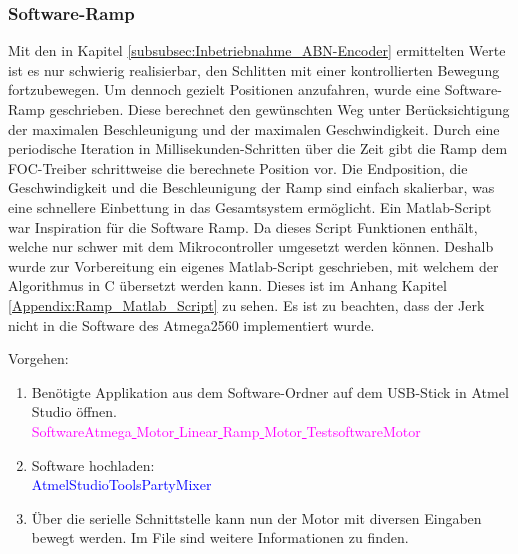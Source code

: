 \subsubsection{Software-Ramp}
\label{subsubsec:Software_Ramp}

Mit den in Kapitel \ref{subsubsec:Inbetriebnahme_ABN-Encoder} ermittelten Werte ist es nur schwierig realisierbar, den Schlitten mit einer kontrollierten Bewegung fortzubewegen. Um dennoch gezielt Positionen anzufahren, wurde eine Software-Ramp geschrieben. Diese berechnet den gewünschten Weg unter Berücksichtigung der maximalen Beschleunigung und der maximalen Geschwindigkeit. Durch eine periodische Iteration in Millisekunden-Schritten über die Zeit gibt die Ramp dem FOC-Treiber schrittweise die berechnete Position vor. Die Endposition, die Geschwindigkeit und die Beschleunigung der Ramp sind einfach skalierbar, was eine schnellere Einbettung in das Gesamtsystem ermöglicht. Ein Matlab-Script war Inspiration für die Software Ramp. Da dieses Script Funktionen enthält, welche nur schwer mit dem Mikrocontroller umgesetzt werden können. Deshalb wurde zur Vorbereitung ein eigenes Matlab-Script geschrieben, mit welchem der Algorithmus in C übersetzt werden kann. Dieses ist im Anhang Kapitel \ref{Appendix:Ramp_Matlab_Script} zu sehen. Es ist zu beachten, dass der Jerk nicht in die Software des Atmega2560 implementiert wurde. \cite{bearee_gentrajm_2007}

Vorgehen:
\begin{enumerate}
\item Benötigte Applikation aus dem Software-Ordner auf dem USB-Stick in Atmel Studio öffnen.\\
\textcolor{magenta}{Software\textrightarrow Atmega\underline{ }Motor\underline{ }Linear\underline{ }Ramp\underline{ }Motor\underline{ }Testsoftware\textrightarrow Motor}\\

\item Software hochladen:\\
\textcolor{blue}{AtmelStudio\textrightarrow Tools\textrightarrow PartyMixer}\\

\item Über die serielle Schnittstelle kann nun der Motor mit diversen Eingaben bewegt werden. Im File sind weitere Informationen zu finden.

\end{enumerate}